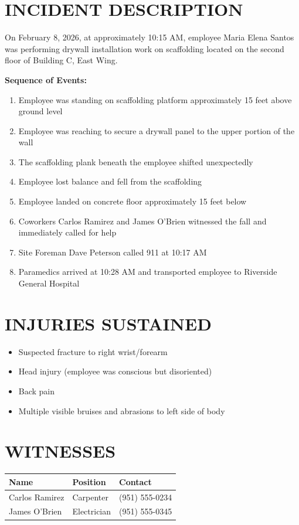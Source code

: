 \documentclass[11pt]{article}
\begin{document}
\section*{INCIDENT DESCRIPTION}

On February 8, 2026, at approximately 10:15 AM, employee Maria Elena Santos was performing drywall installation work on scaffolding located on the second floor of Building C, East Wing.

\textbf{Sequence of Events:}
\begin{enumerate}
\item Employee was standing on scaffolding platform approximately 15 feet above ground level
\item Employee was reaching to secure a drywall panel to the upper portion of the wall
\item The scaffolding plank beneath the employee shifted unexpectedly
\item Employee lost balance and fell from the scaffolding
\item Employee landed on concrete floor approximately 15 feet below
\item Coworkers Carlos Ramirez and James O'Brien witnessed the fall and immediately called for help
\item Site Foreman Dave Peterson called 911 at 10:17 AM
\item Paramedics arrived at 10:28 AM and transported employee to Riverside General Hospital
\end{enumerate}

\section*{INJURIES SUSTAINED}

\begin{itemize}
\item Suspected fracture to right wrist/forearm
\item Head injury (employee was conscious but disoriented)
\item Back pain
\item Multiple visible bruises and abrasions to left side of body
\end{itemize}

\section*{WITNESSES}

\begin{tabular}{@{}p{4cm}p{4cm}p{6cm}@{}}
\toprule
\textbf{Name} & \textbf{Position} & \textbf{Contact} \\
\midrule
Carlos Ramirez & Carpenter & (951) 555-0234 \\
James O'Brien & Electrician & (951) 555-0345 \\
\bottomrule
\end{tabular}
\end{document}
